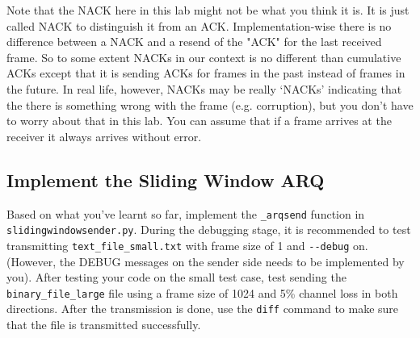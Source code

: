 \documentclass[11pt]{article}
\begin{document}
Note that the NACK here in this lab might not be what you think it is. It is just called NACK to distinguish it from an ACK.
Implementation-wise there is no difference between a NACK and a resend of the "ACK" for the last received frame.
So to some extent NACKs in our context is no different than cumulative ACKs except that it is sending ACKs for frames in the past instead of frames in the future.
In real life, however, NACKs may be really `NACKs' indicating that the there is something wrong with the frame (e.g. corruption), but you don't have to worry about that in this lab. You can assume that if a frame arrives at the receiver it always arrives without error.


\subsection{Implement the Sliding Window ARQ}
Based on what you've learnt so far, implement the \texttt{\_arqsend} function in \texttt{slidingwindowsender.py}.
During the debugging stage, it is recommended to test transmitting \texttt{text\_file\_small.txt} with frame size of 1 and \texttt{-{}-debug} on.
(However, the DEBUG messages on the sender side needs to be implemented by you).
After testing your code on the small test case, test sending the \texttt{binary\_file\_large} file using a frame size of 1024 and 5\% channel loss in both directions.
After the transmission is done, use the \texttt{diff} command to make sure that the file is transmitted successfully.


\end{document}
